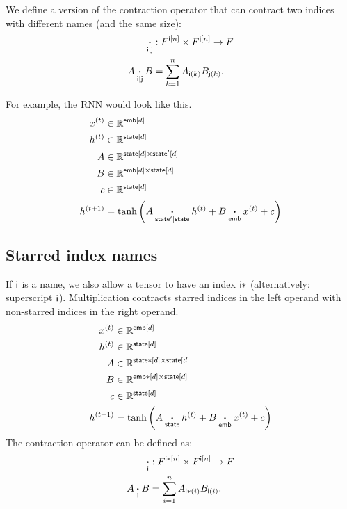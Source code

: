 \documentclass{article}
\newcommand{\nndot}[2]{\mathbin{\mathop{\boldsymbol\cdot}\limits_{\name{#1}|\name{#2}}}}
\begin{document}
We define a version of the contraction operator that can contract two indices with different names (and the same size):
\begin{align*}
\nndot{i}{j} &: F^{\nset{i}{n}} \times F^{\nset{j}{n}} \rightarrow F \\
A \nndot{i}{j} B &= \sum_{k=1}^n A_{\nidx{i}{k}} B_{\nidx{j}{k}}.
\end{align*}

For example, the RNN would look like this.
\begin{align*}
x^{(t)} &\in \mathbb{R}^{\nset{emb}{d}} \\
h^{(t)} &\in \mathbb{R}^{\nset{state}{d}} \\
A &\in \mathbb{R}^{\nset{state}{d} \times \nset{state'}{d}} \\
B &\in \mathbb{R}^{\nset{emb}{d} \times \nset{state}{d}} \\
c &\in \mathbb{R}^{\nset{state}{d}} \\
h^{(t+1)} &= \tanh\left( A \nndot{state'}{state} h^{(t)} + B \ndot{emb} x^{(t)} + c \right)
\end{align*}

\subsection{Starred index names}

If $\mathsf{i}$ is a name, we also allow a tensor to have an index $\mathsf{i*}$ (alternatively: superscript $\mathsf{i}$). Multiplication contracts starred indices in the left operand with non-starred indices in the right operand.
\begin{align*}
x^{(t)} &\in \mathbb{R}^{\mathsf{emb}[d]} \\
h^{(t)} &\in \mathbb{R}^{\mathsf{state}[d]} \\
A &\in \mathbb{R}^{\mathsf{state*}[d] \times \mathsf{state}[d]} \\
B &\in \mathbb{R}^{\mathsf{emb*}[d] \times \mathsf{state}[d]} \\
c &\in \mathbb{R}^{\mathsf{state}[d]} \\
h^{(t+1)} &= \tanh\left( A \mathbin{\mathop{\boldsymbol\cdot}\limits_{\mathsf{state}}} h^{(t)} + B \mathbin{\mathop{\boldsymbol\cdot}\limits_{\mathsf{emb}}} x^{(t)} + c \right) 
\end{align*}
The contraction operator can be defined as:
\begin{align*}
\mathbin{\mathop{\boldsymbol\cdot}\limits_{\mathsf{i}}} &: F^{\mathsf{i*}[n]} \times F^{\mathsf{i}[n]} \rightarrow F \\
A \mathbin{\mathop{\boldsymbol\cdot}\limits_{\mathsf{i}}} B &= \sum_{i=1}^n A_{\mathsf{i*}(i)} B_{\mathsf{i}(i)}.
\end{align*}
\end{document}
